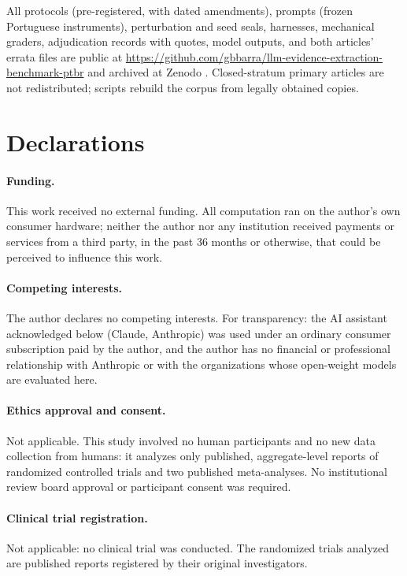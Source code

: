 \documentclass[11pt]{article}
\begin{document}
All protocols (pre-registered, with dated amendments), prompts (frozen Portuguese instruments), perturbation and seed seals, harnesses, mechanical graders, adjudication records with quotes, model outputs, and both articles' errata files are public at \url{https://github.com/gbbarra/llm-evidence-extraction-benchmark-ptbr} and archived at Zenodo \citep{barra2026extrai}. Closed-stratum primary articles are not redistributed; scripts rebuild the corpus from legally obtained copies.

\section*{Declarations}

\paragraph{Funding.} This work received no external funding. All computation ran on the author's own consumer hardware; neither the author nor any institution received payments or services from a third party, in the past 36 months or otherwise, that could be perceived to influence this work.

\paragraph{Competing interests.} The author declares no competing interests. For transparency: the AI assistant acknowledged below (Claude, Anthropic) was used under an ordinary consumer subscription paid by the author, and the author has no financial or professional relationship with Anthropic or with the organizations whose open-weight models are evaluated here.

\paragraph{Ethics approval and consent.} Not applicable. This study involved no human participants and no new data collection from humans: it analyzes only published, aggregate-level reports of randomized controlled trials and two published meta-analyses. No institutional review board approval or participant consent was required.

\paragraph{Clinical trial registration.} Not applicable: no clinical trial was conducted. The randomized trials analyzed are published reports registered by their original investigators.
\end{document}
